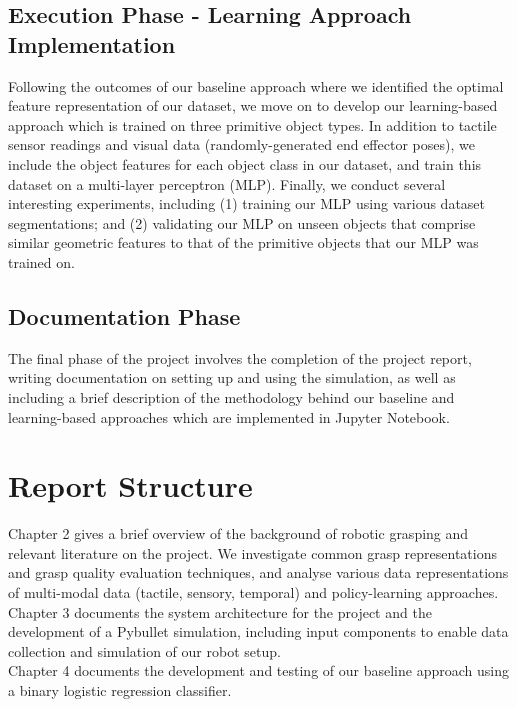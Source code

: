 \documentclass[11pt, a4paper]{report}
\begin{document}
\subsection{Execution Phase - Learning Approach Implementation}\label{sec:1.4.4}
Following the outcomes of our baseline approach where we identified the optimal feature representation of our dataset, we move on to develop our learning-based approach which is trained on three primitive object types. In addition to tactile sensor readings and visual data (randomly-generated end effector poses), we include the object features for each object class in our dataset, and train this dataset on a multi-layer perceptron (MLP). Finally, we conduct several interesting experiments, including (1) training our MLP using various dataset segmentations; and (2) validating our MLP on unseen objects that comprise similar geometric features to that of the primitive objects that our MLP was trained on.


\subsection{Documentation Phase}\label{sec:1.4.5}
The final phase of the project involves the completion of the project report, writing documentation on setting up and using the simulation, as well as including a brief description of the methodology behind our baseline and learning-based approaches which are implemented in Jupyter Notebook.


\section{Report Structure}\label{sec:1.5}
Chapter 2 gives a brief overview of the background of robotic grasping and relevant literature on the project. We investigate common grasp representations and grasp quality evaluation techniques, and analyse various data representations of multi-modal data (tactile, sensory, temporal) and policy-learning approaches.\\

Chapter 3 documents the system architecture for the project and the development of a Pybullet simulation, including input components to enable data collection and simulation of our robot setup.\\

Chapter 4 documents the development and testing of our baseline approach using a binary logistic regression classifier.\\
\end{document}
